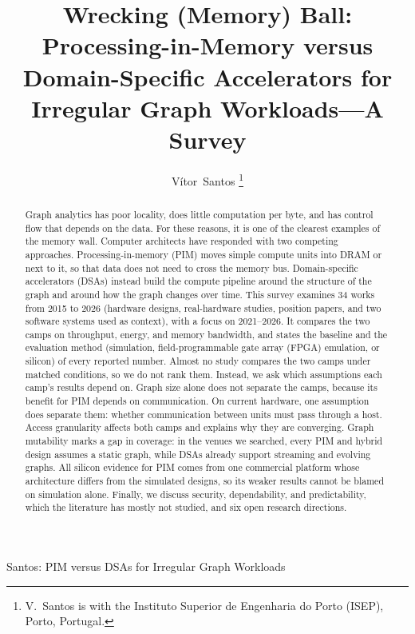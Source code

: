 \documentclass[journal,onecolumn]{IEEEtran}
\begin{document}
\title{Wrecking (Memory) Ball: Processing-in-Memory versus Domain-Specific Accelerators for Irregular Graph Workloads---A Survey}

\author{Vítor~Santos%
\thanks{V.~Santos is with the Instituto Superior de Engenharia do Porto (ISEP), Porto, Portugal.}}

%
{Santos: PIM versus DSAs for Irregular Graph Workloads}

\maketitle

\begin{abstract}
Graph analytics has poor locality, does little computation per byte, and has control flow that depends on the data. For these reasons, it is one of the clearest examples of the memory wall. Computer architects have responded with two competing approaches. Processing-in-memory (PIM) moves simple compute units into DRAM or next to it, so that data does not need to cross the memory bus. Domain-specific accelerators (DSAs) instead build the compute pipeline around the structure of the graph and around how the graph changes over time. This survey examines 34 works from 2015 to 2026 (hardware designs, real-hardware studies, position papers, and two software systems used as context), with a focus on 2021--2026. It compares the two camps on throughput, energy, and memory bandwidth, and states the baseline and the evaluation method (simulation, field-programmable gate array (FPGA) emulation, or silicon) of every reported number. Almost no study compares the two camps under matched conditions, so we do not rank them. Instead, we ask which assumptions each camp's results depend on. Graph size alone does not separate the camps, because its benefit for PIM depends on communication. On current hardware, one assumption does separate them: whether communication between units must pass through a host. Access granularity affects both camps and explains why they are converging. Graph mutability marks a gap in coverage: in the venues we searched, every PIM and hybrid design assumes a static graph, while DSAs already support streaming and evolving graphs. All silicon evidence for PIM comes from one commercial platform whose architecture differs from the simulated designs, so its weaker results cannot be blamed on simulation alone. Finally, we discuss security, dependability, and predictability, which the literature has mostly not studied, and six open research directions.
\end{abstract}
\end{document}
